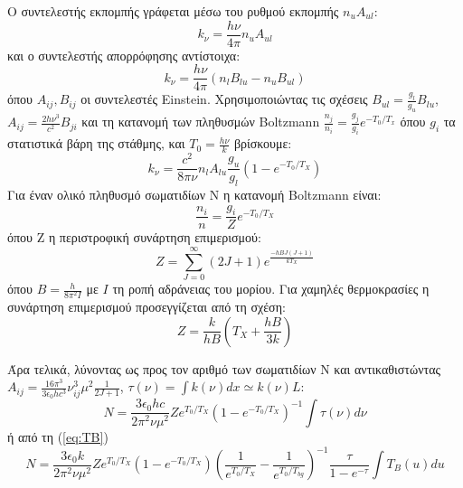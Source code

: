 \documentclass[a4paper,12pt]{memoir}
\begin{document}
Ο συντελεστής εκπομπής γράφεται μέσω του ρυθμού εκπομπής $n_u A_{ul}$:
\begin{equation}
k_{\nu}=\frac{h \nu}{4 \pi} n_u A_{ul}
\end{equation}
και ο συντελεστής απορρόφησης αντίστοιχα:
\begin{equation}
k_{\nu}=\frac{h \nu}{4 \pi} \left( n_l B_{lu}-n_u B_{ul} \right) 
\end{equation}
όπου $A_{ij},B_{ij}$ οι συντελεστές Einstein.
Χρησιμοποιώντας τις σχέσεις $B_{ul}=\frac{g_l}{g_u} B_{lu}$, $A_{ij}=\frac{2h\nu ^3}{c^2}B_{ji}$ και τη κατανομή των πληθυσμών Boltzmann $\frac{n_j}{n_i}=\frac{g_j}{g_i} e^{-T_0/T_x}$  όπου $g_i$ τα στατιστικά βάρη της στάθμης, και $T_0=\frac{h\nu}{k}$ βρίσκουμε:
\begin{equation}
k_{\nu}=\frac{c^2}{8 \pi \nu} n_l A_{lu} \frac{g_u}{g_l} \left(1-e^{-T_0/T_X} \right) 
\end{equation}
%
Για έναν ολικό πληθυσμό σωματιδίων N η κατανομή Βoltzmann είναι:
\begin{equation}
\frac{n_i}{n}=\frac{g_i}{Z}e^{-T_0/T_X}
\end{equation} 
όπου Z η περιστροφική συνάρτηση επιμερισμού:
\begin{equation}
Z=\sum\limits_{J=0}^{\infty} (2J+1)e^{\frac{-h B J(J+1)}{k T_X}}
\end{equation}
όπου $B=\frac{h}{8 \pi ^2 I}$ με $I$ τη ροπή αδράνειας του μορίου.
Για χαμηλές θερμοκρασίες η συνάρτηση επιμερισμού προσεγγίζεται από τη σχέση:
\begin{equation}
Z=\frac{k}{hB}\left( T_X + \frac{hB}{3k} \right) 
\end{equation}

Άρα τελικά, λύνοντας ως προς τον αριθμό των σωματιδίων N και αντικαθιστώντας $A_{ij}=\frac{16 \pi ^3}{3 \epsilon _0 h c^3} \nu _{ij} ^3 \mu ^2 \frac{1}{2J+1}$, $\tau(\nu)=\int k(\nu) dx \simeq k(\nu) L$:
\begin{equation}
N=\frac{3 \epsilon _0 h c}{2 \pi ^2 \nu \mu ^2 } Z e^{T_0/T_X} \left(1-e^{-T_0/T_X} \right) ^{-1} \int \tau (\nu) d\nu
\end{equation}
ή από τη (\ref{eq:TB})
\begin{equation}
N=\frac{3 \epsilon _0 k}{2 \pi ^2 \nu \mu ^2 } Z e^{T_0/T_X} \left(1-e^{-T_0/T_X} \right) \left( \frac{1}{e^{T_0/T_X}}-\frac{1}{e^{T_0/T_{bg}}} \right)^{-1} \frac{\tau}{1-e^{-\tau}} \int T_B (u) du
\end{equation}
\end{document}
